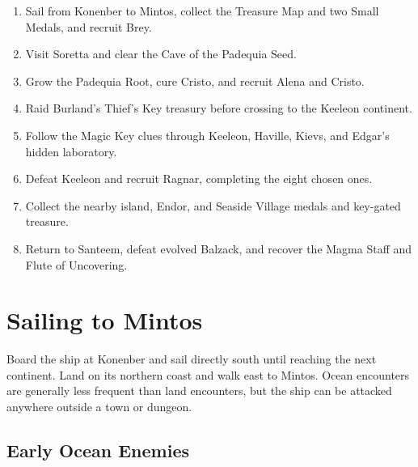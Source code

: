 \documentclass[
  american,
  10pt,
  letterpaper,
  oneside,
  open=any]{scrreprt}
\providecommand{\tightlist}{%
  \setlength{\itemsep}{0pt}\setlength{\parskip}{0pt}}
\begin{document}
\begin{enumerate}
\def\labelenumi{\arabic{enumi}.}
\tightlist
\item
  Sail from Konenber to Mintos, collect the Treasure Map and two Small
  Medals, and recruit Brey.
\item
  Visit Soretta and clear the Cave of the Padequia Seed.
\item
  Grow the Padequia Root, cure Cristo, and recruit Alena and Cristo.
\item
  Raid Burland's Thief's Key treasury before crossing to the Keeleon
  continent.
\item
  Follow the Magic Key clues through Keeleon, Haville, Kievs, and
  Edgar's hidden laboratory.
\item
  Defeat Keeleon and recruit Ragnar, completing the eight chosen ones.
\item
  Collect the nearby island, Endor, and Seaside Village medals and
  key-gated treasure.
\item
  Return to Santeem, defeat evolved Balzack, and recover the Magma Staff
  and Flute of Uncovering.
\end{enumerate}

\section{Sailing to Mintos}\label{sailing-to-mintos}

Board the ship at Konenber and sail directly south until reaching the
next continent. Land on its northern coast and walk east to Mintos.
Ocean encounters are generally less frequent than land encounters, but
the ship can be attacked anywhere outside a town or dungeon.

\subsection{Early Ocean Enemies}\label{early-ocean-enemies}
\end{document}
